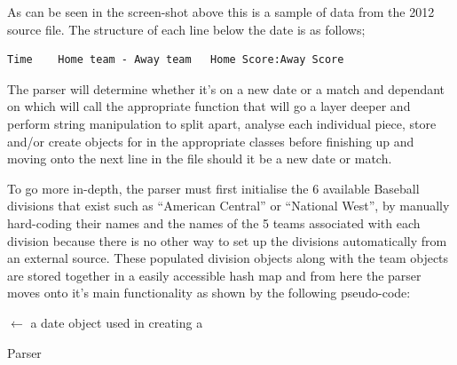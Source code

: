 As can be seen in the screen-shot above this is a sample of data from the 2012
source file. The structure of each line below the date is as follows;

\begin{verbatim}
Time 	Home team - Away team 	Home Score:Away Score
\end{verbatim}

The parser will determine whether it's on a new date or a match and dependant on
which will call the appropriate function that will go a layer deeper and perform
string manipulation to split apart, analyse each individual piece, store and/or
create objects for in the appropriate classes before finishing up and moving
onto the next line in the file should it be a new date or match.

To go more in-depth, the parser must first initialise the 6 available Baseball
divisions that exist such as ``American Central'' or ``National West'', by
manually hard-coding their names and the names of the 5 teams associated with
each division because there is no other way to set up the divisions
automatically from an external source. These populated division objects along
with the team objects are stored together in a easily accessible hash map and
from here the parser moves onto it's main functionality as shown by the
following pseudo-code:

\IncMargin{2em}
\begin{algorithm}
  \SetAlgoLined
   
   
   

  \Date $\leftarrow$ a date object used in creating a \Match\;
    \caption{Parser}\label{PARSER}
\end{algorithm}
\DecMargin{2em}

\clearpage